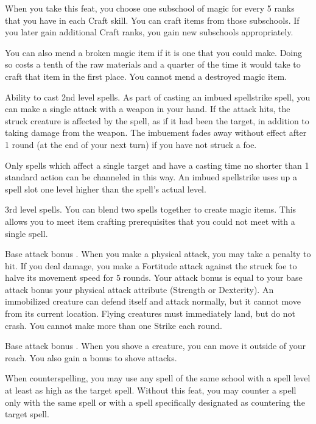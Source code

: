 When you take this feat, you choose one subschool of magic for every 5 ranks that you have in each Craft skill. You can craft items from those subschools. If you later gain additional Craft ranks, you gain new subschools appropriately.

You can also mend a broken magic item if it is one that you could make. Doing so costs a tenth of the raw materials and a quarter of the time it would take to craft that item in the first place. You cannot mend a destroyed magic item.

 Ability to cast 2nd level spells.
 As part of casting an imbued spellstrike spell, you can make a single attack with a weapon in your hand. If the attack hits, the struck creature is affected by the spell, as if it had been the target, in addition to taking damage from the weapon. The imbuement fades away without effect after 1 round (at the end of your next turn) if you have not struck a foe.

Only spells which affect a single target and have a casting time no shorter than 1 standard action can be channeled in this way. An imbued spellstrike uses up a spell slot one level higher than the spell's actual level.

 3rd level spells.
 You can blend two spells together to create magic items. This allows you to meet item crafting prerequisites that you could not meet with a single spell.

\featpre Base attack bonus .
\featben When you make a physical attack, you may take a  penalty to hit. If you deal damage, you make a Fortitude attack against the struck foe to halve its movement speed for 5 rounds. Your attack bonus is equal to your base attack bonus \add your physical attack attribute (Strength or Dexterity). An immobilized creature can defend itself and attack normally, but it cannot move from its current location. Flying creatures must immediately land, but do not crash. You cannot make more than one Strike each round.

 Base attack bonus .
 When you shove a creature, you can move it outside of your reach. You also gain a  bonus to shove attacks.

 When counterspelling, you may use any spell of the same school with a spell level at least as high as the target spell.
 Without this feat, you may counter a spell only with the same spell or with a spell specifically designated as countering the target spell.

